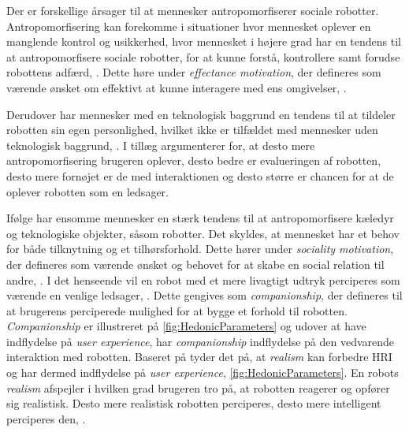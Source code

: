 Der er forskellige årsager til at mennesker antropomorfiserer sociale robotter. Antropomorfisering kan forekomme i situationer hvor mennesket oplever en manglende kontrol og usikkerhed, hvor mennesket i højere grad har en tendens til at antropomorfisere sociale robotter, for at kunne forstå, kontrollere samt forudse robottens adfærd, \parencite[s. 1478]{PDF:ExploringInfluencingVariable}. Dette høre under \textit{effectance motivation}, der defineres som værende ønsket om effektivt at kunne interagere med ens omgivelser, \parencite[s. 62]{PDF:EffectsOfAnticipatedHRI}.

Derudover har mennesker med en teknologisk baggrund en tendens til at tildeler robotten sin egen personlighed, hvilket ikke er tilfældet med mennesker uden teknologisk baggrund, \parencite[s. 19]{PDF:CloseButNotStuck}. I tillæg argumenterer \textcite[s. 2]{PDF:SharingALifeHarvey} for, at desto mere antropomorfisering brugeren oplever, desto bedre er evalueringen af robotten, desto mere fornøjet er de med interaktionen og desto større er chancen for at de oplever robotten som en ledsager.

Ifølge \textcite[s. 61]{PDF:EffectsOfAnticipatedHRI} har ensomme mennesker en stærk tendens til at antropomorfisere kæledyr og teknologiske objekter, såsom robotter. Det skyldes, at mennesket har et behov for både tilknytning og et tilhørsforhold. Dette hører under \textit{sociality motivation}, der defineres som værende ønsket og behovet for at skabe en social relation til andre, \parencite[s. 61]{PDF:EffectsOfAnticipatedHRI}. I det henseende vil en robot med et mere livagtigt udtryk perciperes som værende en venlige ledsager, \parencite[s. 1478]{PDF:ExploringInfluencingVariable}. Dette gengives som \textit{companionship}, der defineres til at brugerens perciperede mulighed for at bygge et forhold til robotten. \textit{Companionship} er illustreret på \autoref{fig:HedonicParameters} og udover at have indflydelse på \textit{user experience}, har \textit{companionship} indflydelse på den vedvarende interaktion med robotten. \blankline
%
Baseret på \textcite[s. 1478]{PDF:ExploringInfluencingVariable} tyder det på, at \textit{realism} kan forbedre HRI og har dermed indflydelse på \textit{user experience}, \autoref{fig:HedonicParameters}. En robots \textit{realism} afspejler i hvilken grad brugeren tro på, at robotten reagerer og opfører sig realistisk. Desto mere realistisk robotten perciperes, desto mere intelligent perciperes den, \parencite[s. 1478]{PDF:ExploringInfluencingVariable}. 

